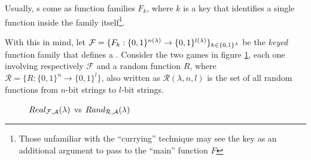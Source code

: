 Usually, \prf{}s come as function families $F_k$, where $k$ is a key that identifies a single function inside the family itself\footnote{Those unfamiliar with the ``currying'' technique may see the key as an additional argument to pass to the ``main'' function $F$}.

With this in mind, let $\mathcal{F}=\{ F_{k}:\{0,1\}^{n(\lambda)} \to \{0,1\}^{l(\lambda)} \}_{k \in \{0,1\}^{\lambda}}$ be the \emph{keyed} function family that defines a \prf. Consider the two games in figure \ref{fig:prftwins}, each one involving respectively $\mathcal{F}$ and a random function $R$, where $\mathcal{R}=\{R : \{0, 1\}^{n} \to \{0, 1\}^{l}\}$, also written as $\mathcal{R}(\lambda, n, l)$ is the set of all random functions from $n$-bit strings to $l$-bit strings.

\begin{figure}[ht]
    \centering
    \sdinit{}
    \sdinit{}

    \caption{$Real_{\mathcal{F}, \mathcal{A}}(\lambda)$ vs $Rand_{\mathcal{R}, \mathcal{A}}(\lambda)$}
    \label{fig:prftwins}
\end{figure}

